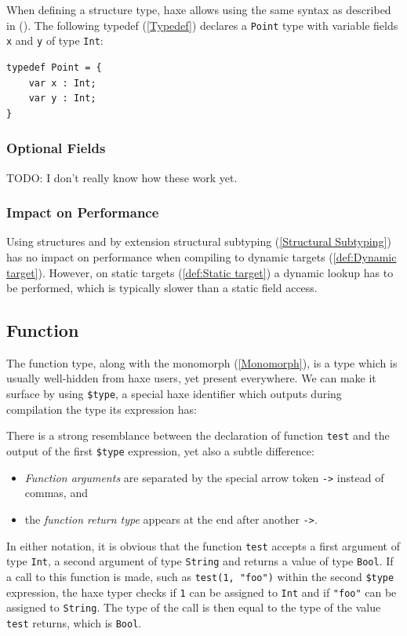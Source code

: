 \documentclass{article}
\newcommand{\type}[1]{\texttt{#1}}
\newcommand{\expr}[1]{\texttt{#1}}
\newcommand{\Fullref}[1]{\nameref{#1} (\Cref{#1})}
\newcommand{\tref}[2]{#1 (\ref{#2})}
\newcommand{\todo}[1]{TODO: #1}
\begin{document}
When defining a structure type, haxe allows using the same syntax as described in \Fullref{Class Fields}. The following \tref{typedef}{Typedef} declares a \type{Point} type with variable fields \expr{x} and \expr{y} of type \type{Int}:

\begin{lstlisting}
typedef Point = {
    var x : Int;
    var y : Int;
}
\end{lstlisting}

\subsubsection{Optional Fields}

\todo{I don't really know how these work yet.}

\subsubsection{Impact on Performance}
\label{Structure Impact on Performance}

Using structures and by extension \tref{structural subtyping}{Structural Subtyping} has no impact on performance when compiling to \tref{dynamic targets}{def:Dynamic target}. However, on \tref{static targets}{def:Static target} a dynamic lookup has to be performed, which is typically slower than a static field access.



\subsection{Function}
\label{Function}

The function type, along with the \tref{monomorph}{Monomorph}, is a type which is usually well-hidden from haxe users, yet present everywhere. We can make it surface by using \expr{\$type}, a special haxe identifier which outputs during compilation the type its expression has:



There is a strong resemblance between the declaration of function \expr{test} and the output of the first \expr{\$type} expression, yet also a subtle difference:

\begin{itemize}
	\item \emph{Function arguments} are separated by the special arrow token \expr{->} instead of commas, and
	\item the \emph{function return type} appears at the end after another \expr{->}.
\end{itemize}
In either notation, it is obvious that the function \expr{test} accepts a first argument of type \type{Int}, a second argument of type \type{String} and returns a value of type \type{Bool}. If a call to this function is made, such as \expr{test(1, "foo")} within the second \expr{\$type} expression, the haxe typer checks if \expr{1} can be assigned to \type{Int} and if \expr{"foo"} can be assigned to \type{String}. The type of the call is then equal to the type of the value \expr{test} returns, which is \type{Bool}.
\end{document}

